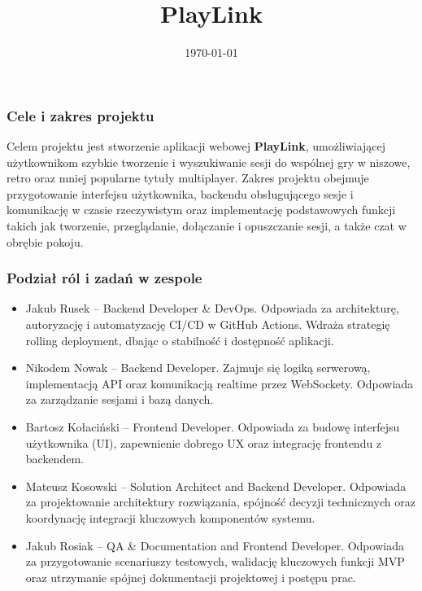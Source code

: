 \documentclass{beamer}
\title{PlayLink}
\author{
	\texorpdfstring{  %
		Bartosz Kołaciński 251554 \and
		Mateusz Kosowski 251558 \\
		Nikodem Nowak 251598 \and
		Jakub Rosiak 251620 \\
		Jakub Rusek 247774
	}{}
}
\date{\today}
\begin{document}
	
	\frame{\titlepage}
	
	\begin{frame}
		\frametitle{Cele i zakres projektu}
		
		Celem projektu jest stworzenie aplikacji webowej \textbf{PlayLink}, umożliwiającej użytkownikom szybkie tworzenie i wyszukiwanie sesji do wspólnej gry w niszowe, retro oraz mniej popularne tytuły multiplayer. Zakres projektu obejmuje przygotowanie interfejsu użytkownika, backendu obsługującego sesje i komunikację w czasie rzeczywistym oraz implementację podstawowych funkcji takich jak tworzenie, przeglądanie, dołączanie i opuszczanie sesji, a także czat w obrębie pokoju.
	\end{frame}
	
	\begin{frame}[shrink=10]
		\frametitle{Podział ról i zadań w zespole}
		
		\begin{itemize}
			\item Jakub Rusek – Backend Developer \& DevOps. Odpowiada za architekturę, autoryzację i automatyzację CI/CD w GitHub Actions. Wdraża strategię rolling deployment, dbając o stabilność i dostępność aplikacji.
			\item Nikodem Nowak – Backend Developer. Zajmuje się logiką serwerową, implementacją API oraz komunikacją realtime przez WebSockety. Odpowiada za zarządzanie sesjami i bazą danych.
			\item Bartosz Kołaciński – Frontend Developer. Odpowiada za budowę interfejsu użytkownika (UI), zapewnienie dobrego UX oraz integrację frontendu z backendem.
			\item Mateusz Kosowski – Solution Architect and Backend Developer. Odpowiada za projektowanie architektury rozwiązania, spójność decyzji technicznych oraz koordynację integracji kluczowych komponentów systemu.
			\item Jakub Rosiak – QA \& Documentation and Frontend Developer. Odpowiada za przygotowanie scenariuszy testowych, walidację kluczowych funkcji MVP oraz utrzymanie spójnej dokumentacji projektowej i postępu prac.
		\end{itemize}
	\end{frame}
	
	
\end{document}
